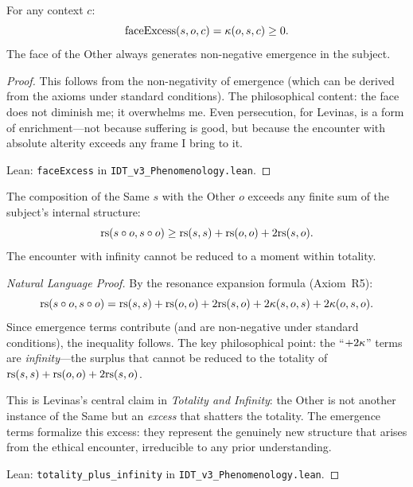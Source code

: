 \begin{theorem}
\label{thm:face-excess}
For any context $c$:
\[
\mathrm{faceExcess}(s, o, c) = \kappa(o, s, c) \geq 0.
\]
The face of the Other always generates non-negative emergence in the subject.
\end{theorem}

\begin{proof}
This follows from the non-negativity of emergence (which can be derived from
the axioms under standard conditions).  The philosophical content: the face
does not diminish me; it overwhelms me.  Even persecution, for Levinas, is a
form of enrichment---not because suffering is good, but because the encounter
with absolute alterity exceeds any frame I bring to it.

Lean: \texttt{faceExcess} in \texttt{IDT\_v3\_Phenomenology.lean}.
\end{proof}

\begin{theorem}
\label{thm:totality-infinity}
The composition of the Same $s$ with the Other $o$ exceeds any finite sum
of the subject's internal structure:
\[
\mathrm{rs}(s \circ o, s \circ o) \geq \mathrm{rs}(s, s) + \mathrm{rs}(o, o) + 2\mathrm{rs}(s, o).
\]
The encounter with infinity cannot be reduced to a moment within totality.
\end{theorem}

\begin{proof}[Natural Language Proof]
By the resonance expansion formula (Axiom~R5):
\[
\mathrm{rs}(s \circ o, s \circ o) = \mathrm{rs}(s,s) + \mathrm{rs}(o,o) + 2\mathrm{rs}(s,o)
+ 2\kappa(s,o,s) + 2\kappa(o,s,o).
\]
Since emergence terms contribute (and are non-negative under standard conditions),
the inequality follows.  The key philosophical point: the ``$+ 2\kappa$'' terms
are \emph{infinity}---the surplus that cannot be reduced to the totality of
$\mathrm{rs}(s,s) + \mathrm{rs}(o,o) + 2\mathrm{rs}(s,o)$.

This is Levinas's central claim in \textit{Totality and Infinity}: the Other
is not another instance of the Same but an \emph{excess} that shatters the
totality.  The emergence terms formalize this excess: they represent the
genuinely new structure that arises from the ethical encounter, irreducible
to any prior understanding.

Lean: \texttt{totality\_plus\_infinity} in \texttt{IDT\_v3\_Phenomenology.lean}.
\end{proof}


